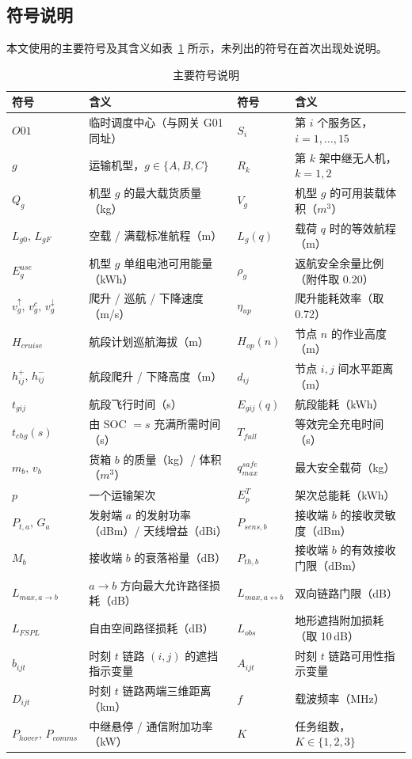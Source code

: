 \subsection{符号说明}

本文使用的主要符号及其含义如表~\ref{tab:symbols} 所示，未列出的符号在首次出现处说明。

\begin{table}[htbp]
	\caption{主要符号说明}
	\label{tab:symbols}
	\centering
	\setlength{\tabcolsep}{4pt}
	\begin{tabular}{llll}
		\toprule
		符号 & 含义 & 符号 & 含义 \\
		\midrule
		$O01$ & 临时调度中心（与网关 G01 同址） & $S_{i}$ & 第 $i$ 个服务区，$i=1,\dots,15$ \\
		$g$ & 运输机型，$g\in\{A,B,C\}$ & $R_{k}$ & 第 $k$ 架中继无人机，$k=1,2$ \\
		$Q_{g}$ & 机型 $g$ 的最大载货质量（kg） & $V_{g}$ & 机型 $g$ 的可用装载体积（$m^{3}$） \\
		$L_{g0},\,L_{gF}$ & 空载 / 满载标准航程（m） & $L_{g}(q)$ & 载荷 $q$ 时的等效航程（m） \\
		$E_{g}^{use}$ & 机型 $g$ 单组电池可用能量（kWh） & $\rho_{g}$ & 返航安全余量比例（附件取 0.20） \\
		$v_{g}^{\uparrow},\,v_{g}^{c},\,v_{g}^{\downarrow}$ & 爬升 / 巡航 / 下降速度（m/s） & $\eta_{up}$ & 爬升能耗效率（取 0.72） \\
		$H_{cruise}$ & 航段计划巡航海拔（m） & $H_{op}(n)$ & 节点 $n$ 的作业高度（m） \\
		$h^{+}_{ij},\,h^{-}_{ij}$ & 航段爬升 / 下降高度（m） & $d_{ij}$ & 节点 $i,j$ 间水平距离（m） \\
		$t_{gij}$ & 航段飞行时间（s） & $E_{gij}(q)$ & 航段能耗（kWh） \\
		$t_{chg}(s)$ & 由 SOC $=s$ 充满所需时间（s） & $T_{full}$ & 等效完全充电时间（s） \\
		$m_{b},\,v_{b}$ & 货箱 $b$ 的质量（kg）/ 体积（$m^{3}$） & $q_{max}^{safe}$ & 最大安全载荷（kg） \\
		$p$ & 一个运输架次 & $E_{p}^{T}$ & 架次总能耗（kWh） \\
		$P_{t,a},\,G_{a}$ & 发射端 $a$ 的发射功率（dBm）/ 天线增益（dBi） & $P_{sens,b}$ & 接收端 $b$ 的接收灵敏度（dBm） \\
		$M_{b}$ & 接收端 $b$ 的衰落裕量（dB） & $P_{th,b}$ & 接收端 $b$ 的有效接收门限（dBm） \\
		$L_{max,a\to b}$ & $a\to b$ 方向最大允许路径损耗（dB） & $L_{max,a\leftrightarrow b}$ & 双向链路门限（dB） \\
		$L_{FSPL}$ & 自由空间路径损耗（dB） & $L_{obs}$ & 地形遮挡附加损耗（取 10\,dB） \\
		$b_{ijt}$ & 时刻 $t$ 链路 $(i,j)$ 的遮挡指示变量 & $A_{ijt}$ & 时刻 $t$ 链路可用性指示变量 \\
		$D_{ijt}$ & 时刻 $t$ 链路两端三维距离（km） & $f$ & 载波频率（MHz） \\
		$P_{hover},\,P_{comms}$ & 中继悬停 / 通信附加功率（kW） & $K$ & 任务组数，$K\in\{1,2,3\}$ \\
		\bottomrule
	\end{tabular}
\end{table}
